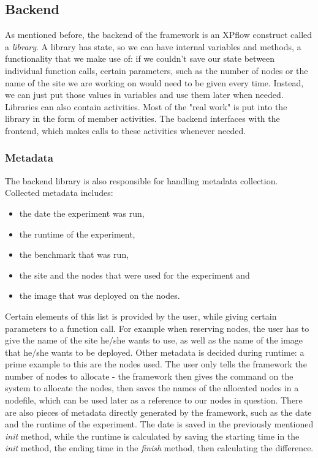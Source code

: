 \subsection{Backend}
As mentioned before, the backend of the framework is an XPflow
construct called a \emph{library}. A library has state, so we can have
internal variables and methods, a functionality that we make use of:
if we couldn't save our state between individual function calls,
certain parameters, such as the number of nodes or the name of the
site we are working on would need to be given every time. Instead, we
can just put those values in variables and use them later when
needed.\\
Libraries can also contain activities. Most of the "real work" is put
into the library in the form of member activities. The backend
interfaces with the frontend, which makes calls to these activities
whenever needed.
\subsubsection{Metadata}
The backend library is also responsible for handling metadata
collection. Collected metadata includes:
\begin{itemize}
\item the date the experiment was run,
\item the runtime of the experiment,
\item the benchmark that was run,
\item the site and the nodes that were used for the experiment and
\item the image that was deployed on the nodes.
\end{itemize}
Certain elements of this list is provided by the user, while giving
certain parameters to a function call. For example when reserving
nodes, the user has to give the name of the site he/she wants to use,
as well as the name of the image that he/she wants to be
deployed. Other metadata is decided during runtime: a prime example to
this are the nodes used. The user only tells the framework the number
of nodes to allocate - the framework then gives the command on the
system to allocate the nodes, then saves the names of the allocated
nodes in a nodefile, which can be used later as a reference to our
nodes in question. There are also pieces of metadata directly
generated by the framework, such as the date and the runtime of the
experiment. The date is saved in the previously mentioned \emph{init}
method, while the runtime is calculated by saving the starting time in
the \emph{init} method, the ending time in the \emph{finish} method,
then calculating the difference.
